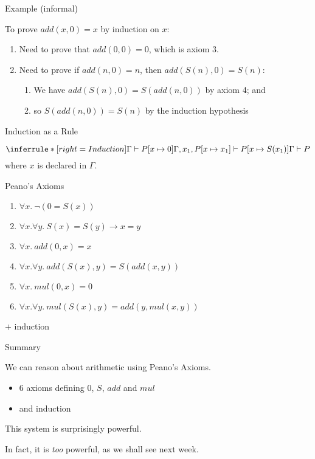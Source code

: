 \documentclass[xetex,aspectratio=169,14pt,hyperref={pdfpagelabels=true,pdflang={en-GB}}]{beamer}
\begin{document}
\begin{frame}
  {Example (informal)}

  To prove $add(x,0) = x$ by induction on $x$:
  \begin{enumerate}
  \item Need to prove that $add(0,0) = 0$, which is axiom 3.
  \item Need to prove if $add(n,0) = n$, then $add(S(n),0) = S(n)$:
    \begin{enumerate}
    \item We have $add(S(n),0) = S(add(n,0))$ by axiom 4; and
    \item so $S(add(n,0)) = S(n)$ by the induction hypothesis
    \end{enumerate}
  \end{enumerate}
\end{frame}

\begin{frame}
  {Induction as a Rule}

  \begin{displaymath}
    \inferrule* [right=Induction]
    {\Gamma \vdash P[x \mapsto 0] \\
      \Gamma, x_1, P[x \mapsto x_1] \vdash P[x \mapsto S(x_1)]}
    {\Gamma \vdash P}
  \end{displaymath}
  where $x$ is declared in $\Gamma$.
\end{frame}

\begin{frame}
  {Peano's Axioms}

  \begin{enumerate}
  \item $\forall x.~\lnot(0 = S(x))$
  \item $\forall x. \forall y.~S(x) = S(y) \to x = y$
  \item $\forall x.~add(0,x) = x$
  \item $\forall x.\forall y.~add(S(x),y) = S(add(x,y))$
  \item $\forall x.~mul(0,x) = 0$
  \item $\forall x. \forall y.~mul(S(x),y) = add(y,mul(x,y))$
  \end{enumerate}
  $+$ induction
\end{frame}

\begin{frame}
  {Summary}

  We can reason about arithmetic using Peano's Axioms.
  \begin{itemize}
  \item 6 axioms defining $0$, $S$, $add$ and $mul$
  \item and induction
  \end{itemize}
  This system is surprisingly powerful.

  \pause
  \bigskip

  In fact, it is \emph{too} powerful, as we shall see next week.
\end{frame}
\end{document}
